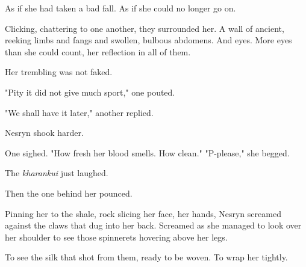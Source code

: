 As if she had taken a bad fall. As if she could no longer go on.

Clicking, chattering to one another, they surrounded her. A wall of ancient, reeking limbs and fangs and swollen, bulbous abdomens. And eyes. More eyes than she could count, her reflection in all of them.

Her trembling was not faked.

"Pity it did not give much sport," one pouted.

"We shall have it later," another replied.

Nesryn shook harder.

One sighed. "How fresh her blood smells. How clean." "P-please," she begged.

The \emph{kharankui} just laughed.

Then the one behind her pounced.

Pinning her to the shale, rock slicing her face, her hands, Nesryn screamed against the claws that dug into her back. Screamed as she managed to look over her shoulder to see those spinnerets hovering above her legs.

To see the silk that shot from them, ready to be woven. To wrap her tightly.

